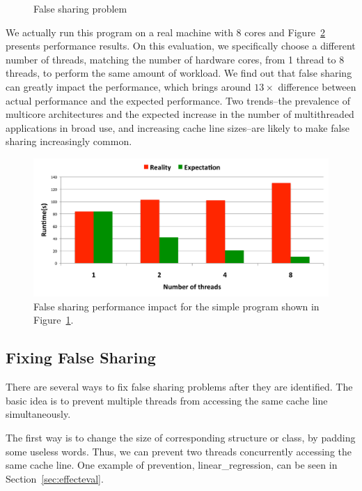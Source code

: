 \begin{figure}[!ht]
{\centering
\fbox{
\subfigure{}
\hspace{20pt}
\subfigure{}
}
\caption{False sharing problem
\label{fig:falsesharingexample}}
}
\end{figure}

We actually run this program on a real machine with 8 cores and Figure~\ref{fig:fsperfimpact} presents performance results. On this evaluation, we specifically choose a different number of threads, matching the number of hardware cores, from 1 thread to 8 threads, to perform the same amount of workload. We find out that false sharing can greatly impact the performance, which brings around $13\times$ difference between actual performance and the expected performance. Two trends--the prevalence of multicore architectures and
the expected increase in the number of multithreaded applications in broad use, and increasing cache line sizes--are likely to make false sharing increasingly common.

\begin{figure}[!t]
\centering
\includegraphics[width=5in]{fig/fsperfimpact.pdf}
\caption{
False sharing performance impact for the simple program shown in Figure~\ref{fig:falsesharingexample}.
\label{fig:fsperfimpact}
}
\end{figure}

\subsection{Fixing False Sharing}
There are several ways to fix false sharing problems after they are identified. The basic idea is to prevent multiple threads from accessing the same cache line simultaneously.  

The first way is to change the size of corresponding structure or class, by padding some useless words. Thus, we can prevent two threads concurrently accessing the same cache line. One example of prevention, linear\_regression, can be seen in Section~\ref{sec:effecteval}.

